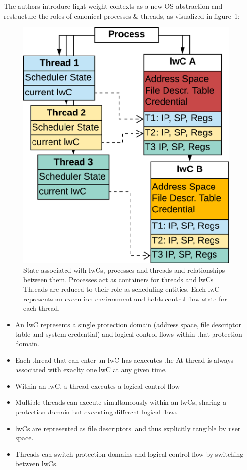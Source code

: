 \documentclass[10pt,twocolumn,letter]{article}
\begin{document}
The authors introduce light-weight contexts as a new OS abstraction and restructure the roles of canonical processes \& threads, as visualized in figure~\ref{design:fig:lwcprocthreadrelationship}:

\begin{figure}[h]
  \label{design:fig:lwcprocthreadrelationship}
  \includegraphics[width=\linewidth]{fig/lwc-proc-thread-relationship}
  \caption{
    State associated with lwCs, processes and threads and relationships between them.
    Processes act as containers for threads and lwCs.
    Threads are reduced to their role as scheduling entities.
    Each lwC represents an execution environment and holds control flow state for each thread.
  }
\end{figure}

\begin{itemize}
\item An lwC represents a single protection domain (address space, file descriptor table and system credential) and logical control flows within that protection domain.
\item Each thread that can enter an lwC has aexecutes the At thread is always associated with exaclty one lwC at any given time.
\item Within an lwC, a thread executes a logical control flow 
\item Multiple threads can execute simultaneously within an lwCs, sharing a protection domain but executing different logical flows.
\item lwCs are represented as file descriptors, and thus explicitly tangible by user space.
\item Threads can switch protection domains and logical control flow by switching between lwCs.
\end{itemize}
\end{document}
